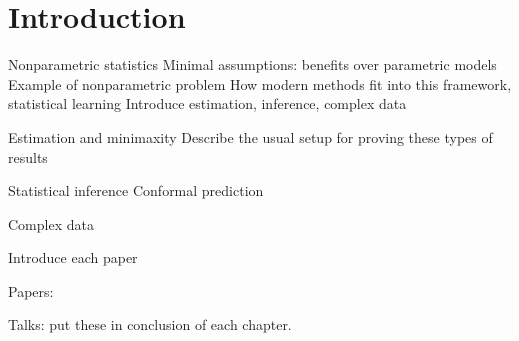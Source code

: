 
\chapter{Introduction}

Nonparametric statistics
Minimal assumptions: benefits over parametric models
Example of nonparametric problem
How modern methods fit into this framework, statistical learning
Introduce estimation, inference, complex data

Estimation and minimaxity
Describe the usual setup for proving these types of results

Statistical inference
Conformal prediction

Complex data

Introduce each paper

Papers:
\cite{%
  cattaneo2024uniform,%
  cattaneo2022yurinskii,%
  cattaneo2023inference%
}

Talks: put these in conclusion of each chapter.
\cite{%
  cattaneo2022talkgeorgia,%
  cattaneo2022talkcolumbia,%
  feng2022talkrenmin,%
  feng2022talkxiamen,%
  feng2023talkpeking,%
  feng2023talksingapore,%
  underwood2024talkmichigan,%
  underwood2024talkillinois,%
  underwood2024talkpitt%
}

